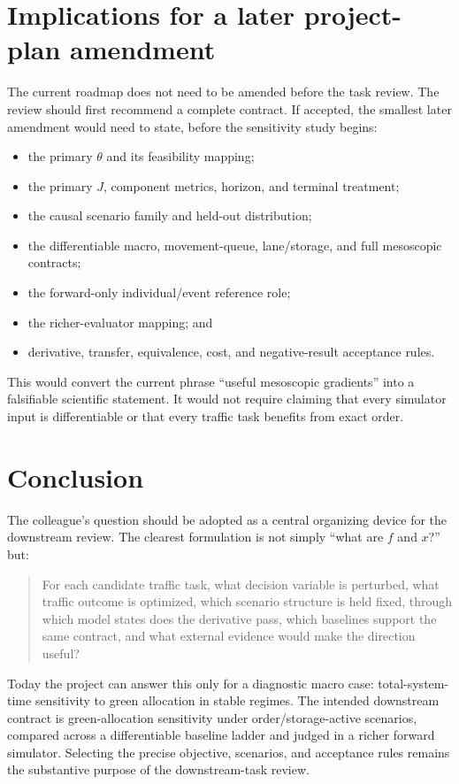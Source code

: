 \documentclass[11pt,a4paper]{article}
\begin{document}
\section{Implications for a later project-plan amendment}

The current roadmap does not need to be amended before the task review. The review should first recommend a complete contract. If accepted, the smallest later amendment would need to state, before the sensitivity study begins:

\begin{itemize}
  \item the primary $\theta$ and its feasibility mapping;
  \item the primary $J$, component metrics, horizon, and terminal treatment;
  \item the causal scenario family and held-out distribution;
  \item the differentiable macro, movement-queue, lane/storage, and full mesoscopic contracts;
  \item the forward-only individual/event reference role;
  \item the richer-evaluator mapping; and
  \item derivative, transfer, equivalence, cost, and negative-result acceptance rules.
\end{itemize}

This would convert the current phrase ``useful mesoscopic gradients'' into a falsifiable scientific statement. It would not require claiming that every simulator input is differentiable or that every traffic task benefits from exact order.

\section{Conclusion}

The colleague's question should be adopted as a central organizing device for the downstream review. The clearest formulation is not simply ``what are $f$ and $x$?'' but:

\begin{quote}
For each candidate traffic task, what decision variable is perturbed, what traffic outcome is optimized, which scenario structure is held fixed, through which model states does the derivative pass, which baselines support the same contract, and what external evidence would make the direction useful?
\end{quote}

Today the project can answer this only for a diagnostic macro case: total-system-time sensitivity to green allocation in stable regimes. The intended downstream contract is green-allocation sensitivity under order/storage-active scenarios, compared across a differentiable baseline ladder and judged in a richer forward simulator. Selecting the precise objective, scenarios, and acceptance rules remains the substantive purpose of the downstream-task review.
\end{document}
